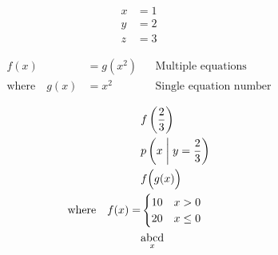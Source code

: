 \documentclass{article}
\begin{document}
\begin{align}
    x &= 1 \\
    y &= 2 \\
    z &= 3 \nonumber
\end{align}

\begin{equation}
\begin{aligned}
    f(x) &= g(x^2) && \text{Multiple equations} \\
    \text{where} \quad g(x) &= x^2 && \text{Single equation number}
\end{aligned}
\end{equation}

\begin{align*}
    &f \left( \frac 2 3 \right) \\
    &p \left( x \;\middle\vert\; y = \frac 2 3 \right) \\
    &f \Bigl( g(x) \Bigr) \\
    \text{where} \quad f(x) = &\begin{cases}
        10 & x > 0 \\
        20 & x \le 0
    \end{cases} \\
    &\underset{x}{\mathrm{abcd}} \\
\end{align*}
\end{document}
